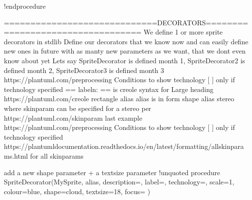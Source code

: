 \documentclass[letterpaper,10pt,english]{sphinxmanual}
\begin{document}
\begin{sphinxVerbatim}[commandchars=\\\{\},numbers=left,firstnumber=1,stepnumber=1]
!endprocedure




\PYGZsq{}=============================DECORATORS==================================
\PYGZsq{} We define 1 or more sprite decorators in stdlib
\PYGZsq{} Define our decorators that we know now \PYGZhy{} and can easily define new ones in future with as manty new parameters 
\PYGZsq{} as we want, that we don\PYGZsq{}t even know about yet
\PYGZsq{} Let\PYGZsq{}s say SpriteDecorator is defined month 1, SpriteDecorator2 is defined month 2, SpriteDecorator3 is defined month 3
\PYGZsq{}
\PYGZsq{} https://plantuml.com/preprocessing Conditions to show technology \PYGZdq{}[ ]\PYGZdq{} only if technology specified
\PYGZsq{}\PYGZdq{}\PYGZdq{}== \PYGZdl{}label\PYGZbs{}n\PYGZdq{}: \PYGZdq{}==\PYGZdq{} is creole syntax for \PYGZdq{}Large heading\PYGZdq{} https://plantuml.com/creole
\PYGZsq{} rectangle \PYGZdl{}alias \PYGZlt{}\PYGZlt{}\PYGZdl{}alias\PYGZgt{}\PYGZgt{} is in form \PYGZdq{}shape alias \PYGZlt{}\PYGZlt{}stereo\PYGZgt{}\PYGZgt{}\PYGZdq{} where skinparam can be specified for a stereo per https://plantuml.com/skinparam last example
\PYGZsq{} https://plantuml.com/preprocessing Conditions to show technology \PYGZdq{}[ ]\PYGZdq{} only if technology specified
\PYGZsq{} https://plantuml\PYGZhy{}documentation.readthedocs.io/en/latest/formatting/all\PYGZhy{}skin\PYGZhy{}params.html for all skinparams
\PYGZsq{}\PYGZhy{}\PYGZhy{}\PYGZhy{}\PYGZhy{}\PYGZhy{}\PYGZhy{}\PYGZhy{}\PYGZhy{}\PYGZhy{}\PYGZhy{}\PYGZhy{}\PYGZhy{}\PYGZhy{}\PYGZhy{}\PYGZhy{}\PYGZhy{}\PYGZhy{}\PYGZhy{}\PYGZhy{}\PYGZhy{}\PYGZhy{}\PYGZhy{}\PYGZhy{}\PYGZhy{}\PYGZhy{}\PYGZhy{}\PYGZhy{}\PYGZhy{}\PYGZhy{}\PYGZhy{}\PYGZhy{}\PYGZhy{}\PYGZhy{}\PYGZhy{}\PYGZhy{}\PYGZhy{}\PYGZhy{}\PYGZhy{}\PYGZhy{}\PYGZhy{}\PYGZhy{}\PYGZhy{}\PYGZhy{}\PYGZhy{}\PYGZhy{}\PYGZhy{}\PYGZhy{}\PYGZhy{}\PYGZhy{}\PYGZhy{}\PYGZhy{}



\PYGZsq{}add a new shape parameter + a textsize parameter
\PYGZsq{}\PYGZhy{}\PYGZhy{}\PYGZhy{}\PYGZhy{}\PYGZhy{}\PYGZhy{}\PYGZhy{}\PYGZhy{}\PYGZhy{}\PYGZhy{}\PYGZhy{}\PYGZhy{}\PYGZhy{}\PYGZhy{}\PYGZhy{}\PYGZhy{}\PYGZhy{}\PYGZhy{}\PYGZhy{}\PYGZhy{}\PYGZhy{}\PYGZhy{}\PYGZhy{}\PYGZhy{}\PYGZhy{}\PYGZhy{}\PYGZhy{}\PYGZhy{}\PYGZhy{}\PYGZhy{}\PYGZhy{}\PYGZhy{}\PYGZhy{}\PYGZhy{}\PYGZhy{}\PYGZhy{}\PYGZhy{}\PYGZhy{}\PYGZhy{}\PYGZhy{}\PYGZhy{}\PYGZhy{}\PYGZhy{}\PYGZhy{}\PYGZhy{}\PYGZhy{}\PYGZhy{}\PYGZhy{}\PYGZhy{}\PYGZhy{}\PYGZhy{}
!unquoted procedure \PYGZdl{}SpriteDecorator(\PYGZdl{}MySprite, \PYGZdl{}alias, \PYGZdl{}description=\PYGZdq{}\PYGZdq{}, \PYGZdl{}label=\PYGZdq{}\PYGZdq{}, \PYGZdl{}technology=\PYGZdq{}\PYGZdq{}, \PYGZdl{}scale=1, \PYGZdl{}colour=\PYGZdq{}blue\PYGZdq{}, \PYGZdl{}shape=\PYGZdq{}cloud\PYGZdq{}, \PYGZdl{}textsize=\PYGZdq{}18\PYGZdq{}, \PYGZdl{}focus=\PYGZdq{}\PYGZdq{} )


\end{sphinxVerbatim}
\end{document}
